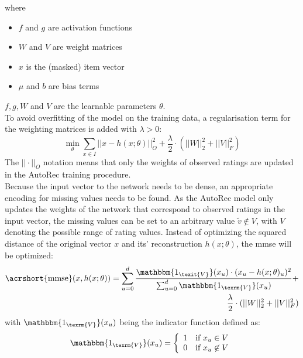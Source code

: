 where\\
\begin{itemize}
    \item $f$ and $g$ are activation functions
    \item $W$ and $V$ are weight matrices
    \item $x$ is the (masked) item vector
    \item $\mu$ and $b$ are bias terms
\end{itemize}
$f, g, W$ and $V$ are the learnable parameters $\theta$.\\
To avoid overfitting of the model on the training data, a regularisation term for the weighting matrices is added with $\lambda > 0$:\\
\begin{equation}
   \min_{\theta}\sum_{x \in I} ||x - h(x; \theta)||^{2}_{O} + \frac{\lambda}{2} \cdot (||W||^{2}_{2} + ||V||^{2}_{F})
\end{equation}
The $||\cdot||_{O}$ notation means that only the weights of observed ratings are updated in the AutoRec training procedure.\\
Because the input vector to the network needs to be dense, an appropriate encoding for missing values needs to be found. As the AutoRec model only updates the weights of the network that correspond to observed ratings in the input vector, the missing values can be set to an arbitrary value $\tilde{v} \not\in V$, with $V$ denoting the possible range of rating values. Instead of optimizing the squared distance of the original vector $x$ and its' reconstruction $h(x; \theta)$, the \acrfull{mmse} will be optimized:\\
\begin{equation}
\begin{align*}
    \text{\acrshort{mmse}}(x, h(x;\theta)) = \sum_{u=0}^{d}\frac{\mathbbm{1_{\texit{V}}}(x_u) \cdot (x_u - h(x;\theta)_u)^{2}}
    {\sum_{u=0}^{d} \mathbbm{1_{\texrm{V}}}(x_u)} + \\ \frac{\lambda}{2} \cdot (||W||^{2}_{2} + ||V||^{2}_{F}) 
\end{align*}
\end{equation}
with $\mathbbm{1_{\texrm{V}}}(x_u)$ being the indicator function defined as:\\
\begin{equation}
    \mathbbm{1_{\texrm{V}}}(x_u) = \left\{
	\begin{array}{ll}
		1  & \mbox{if } x_u \in V\\
		0 & \mbox{if } x_u \not\in V \\
	\end{array}
\right.
\end{equation}
